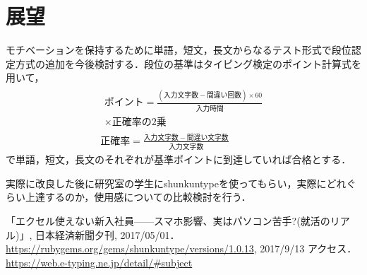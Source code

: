 \documentclass[a4j,twocolumn]{jsarticle}
\begin{document}
\section{展望}
モチベーションを保持するために単語，短文，長文からなるテスト形式で段位認定方式の追加を今後検討する．段位の基準はタイピング検定のポイント計算式を用いて，
\begin{gather*}
\begin{split}
ポイント=\frac{(入力文字数-間違い回数) \times 60}{入力時間} \\
 \times 正確率の2乗
\end{split} \\
正確率 = \frac{入力文字数-間違い文字数}{入力文字数}
\end{gather*}
で単語，短文，長文のそれぞれが基準ポイントに到達していれば合格とする\cite{e-typing}．


実際に改良した後に研究室の学生にshunkuntypeを使ってもらい，実際にどれぐらい上達するのか，使用感についての比較検討を行う．

\vspace{0.3\baselineskip}

\begin{thebibliography}{9}
「エクセル使えない新入社員——スマホ影響、実はパソコン苦手?(就活のリアル)」, 日本経済新聞夕刊, 2017/05/01．
 \url{https://rubygems.org/gems/shunkuntype/versions/1.0.13}, 2017/9/13 アクセス．
 \url{https://web.e-typing.ne.jp/detail/#subject}

\end{thebibliography}
\end{document}
